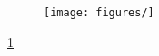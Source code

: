\begin{figure}[htbp]\label{fig:}
   \centering
   \texttt{[image: figures/]}
   \caption{}
\end{figure}

\ref{fig:}
